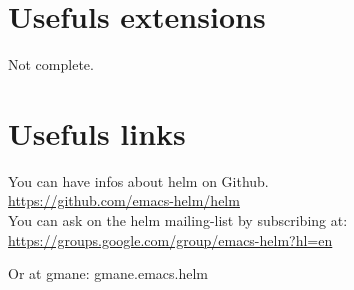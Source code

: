 \documentclass[a4paper,11pt]{article}
\begin{document}
\section{Usefuls extensions}
\label{sec:usefuls-extensions}
Not complete.

\section{Usefuls links}
\label{sec:usefuls-links}

You can have infos about helm on Github.\\
\url{https://github.com/emacs-helm/helm}\\

You can ask on the helm mailing-list by subscribing at:\\
\url{https://groups.google.com/group/emacs-helm?hl=en}

Or at gmane: gmane.emacs.helm
\end{document}
